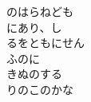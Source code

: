 \documentclass[10pt,b5j]{tarticle} %
\begin{document}
\begin{enumerate}
\begin{minipage}[c]{\blocksize}
        \vspace{\linespace}
        \item
        のはらねども\\
        にあり、し\\
        るをともにせん\\
        ふのに\\
        きぬのする\\
        りのこのかな
    
    \end{minipage}
\end{enumerate} %
\end{document}
